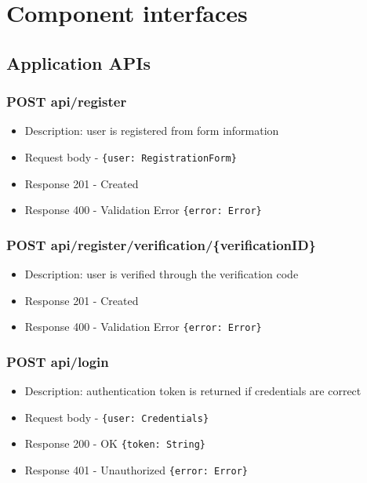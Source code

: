 \section{Component interfaces}

\subsection{Application APIs}

\subsubsection{POST api/register}
\begin{itemize}
    \item Description: user is registered from form information
    \item Request body - \verb|{user: RegistrationForm}|
    \item Response 201 - Created
    \item Response 400 - Validation Error \verb|{error: Error}|
\end{itemize}

\subsubsection{POST api/register/verification/\{verificationID\}}
\begin{itemize}
    \item Description: user is verified through the verification code
    \item Response 201 - Created
    \item Response 400 - Validation Error \verb|{error: Error}|
\end{itemize}

\subsubsection{POST api/login}
\begin{itemize}
    \item Description: authentication token is returned if credentials are correct
    \item Request body - \verb|{user: Credentials}|
    \item Response 200 - OK \verb|{token: String}|
    \item Response 401 - Unauthorized \verb|{error: Error}|
\end{itemize}

